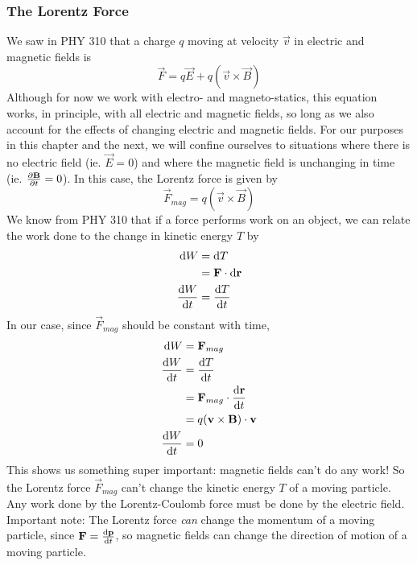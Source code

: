\documentclass[a4paper]{article}
\begin{document}
\subsubsection{The Lorentz Force}
We saw in PHY 310 that a charge $q$ moving at velocity $\vec{v}$ in electric and
magnetic fields is
\[ \vec{F} = q\vec{E} + q(\vec{v}\times\vec{B})\]
Although for now we work with electro- and magneto-statics, this equation
works, in principle, with all electric and magnetic fields, so long as we also
account for the effects of changing electric and magnetic fields.
For our purposes in this chapter and the next, we will confine ourselves to
situations where there is no electric field (ie. $\vec{E}=0$) and where the
magnetic field is unchanging in time (ie. $\frac{\partial \boldsymbol{\mathbf{B}}}{\partial t}=0$). In this case,
the Lorentz force is given by
\[ \vec{F}_{mag} = q(\vec{v}\times\vec{B}) \]
We know from PHY 310 that if a force performs work on an object, we can relate
the work done to the change in kinetic energy $T$ by
\begin{align*}
	\mathrm{d} W &= \mathrm{d} T \\&= \boldsymbol{\mathbf{F}}\cdot\mathrm{d}\boldsymbol{\mathbf{r}}\\
	\frac{\mathrm{d} W}{\mathrm{d} t} &= \frac{\mathrm{d} T}{\mathrm{d} t}
\end{align*}
In our case, since $\vec{F}_{mag}$ should be constant with time,
\begin{align*}
	\mathrm{d} W&= \boldsymbol{\mathbf{F}}_{mag}\\
	\frac{\mathrm{d} W}{\mathrm{d} t} &= \frac{\mathrm{d} T}{\mathrm{d} t}\\
		   &= \boldsymbol{\mathbf{F}}_{mag}\cdot\frac{\mathrm{d} \boldsymbol{\mathbf{r}}}{\mathrm{d} t}\\
		   &= q(\boldsymbol{\mathbf{v}}\times\boldsymbol{\mathbf{B}})\cdot\boldsymbol{\mathbf{v}}\\
	\frac{\mathrm{d} W}{\mathrm{d} t} &= 0
\end{align*}
This shows us something super important: magnetic fields can't do any work!
So the Lorentz force $\vec{F}_{mag}$ can't change the kinetic energy $T$ of
a moving particle. Any work done by the Lorentz-Coulomb force must be done
by the electric field.
Important note: The Lorentz force \emph{can} change the momentum of a moving
particle, since $\boldsymbol{\mathbf{F}}=\frac{\mathrm{d} \boldsymbol{\mathbf{p}}}{\mathrm{d} t}$, so magnetic fields can change
the direction of motion of a moving particle.
\end{document}
